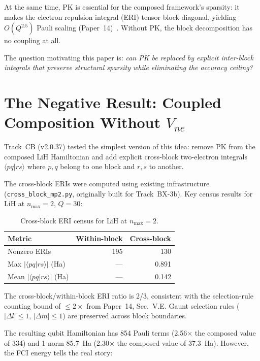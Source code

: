 \documentclass[aps,pra,twocolumn,superscriptaddress,longbibliography]{revtex4-2}
\begin{document}
At the same time, PK is essential for the composed framework's
sparsity: it makes the electron repulsion integral (ERI) tensor
block-diagonal, yielding $O(Q^{2.5})$ Pauli scaling
(Paper~14)~\cite{loutey_paper14}.  Without PK, the block
decomposition has no coupling at all.

The question motivating this paper is: \emph{can PK be replaced by
explicit inter-block integrals that preserve structural sparsity while
eliminating the accuracy ceiling?}


\section{The Negative Result: Coupled Composition Without $V_{ne}$}
\label{sec:negative}

Track~CB (v2.0.37) tested the simplest version of this idea: remove
PK from the composed LiH Hamiltonian and add explicit cross-block
two-electron integrals $\langle pq | rs \rangle$ where $p, q$ belong
to one block and $r, s$ to another.

The cross-block ERIs were computed using existing infrastructure
(\texttt{cross\_block\_mp2.py}, originally built for Track~BX-3b).
Key census results for LiH at $n_{\max} = 2$, $Q = 30$:

\begin{table}[h]
\caption{Cross-block ERI census for LiH at $n_{\max} = 2$.}
\label{tab:census}
\begin{ruledtabular}
\begin{tabular}{lrr}
Metric & Within-block & Cross-block \\
\hline
Nonzero ERIs & 195 & 130 \\
Max $|\langle pq|rs\rangle|$ (Ha) & --- & 0.891 \\
Mean $|\langle pq|rs\rangle|$ (Ha) & --- & 0.142 \\
\end{tabular}
\end{ruledtabular}
\end{table}

The cross-block/within-block ERI ratio is 2/3, consistent with the
selection-rule counting bound of $\le 2\times$ from Paper~14,
Sec.~V.E.  Gaunt selection rules ($|\Delta l| \le 1$,
$|\Delta m| \le 1$) are preserved across block boundaries.

The resulting qubit Hamiltonian has 854 Pauli terms (2.56$\times$ the
composed value of 334) and 1-norm 85.7~Ha (2.30$\times$ the composed
value of 37.3~Ha).  However, the FCI energy tells the real story:
\end{document}
